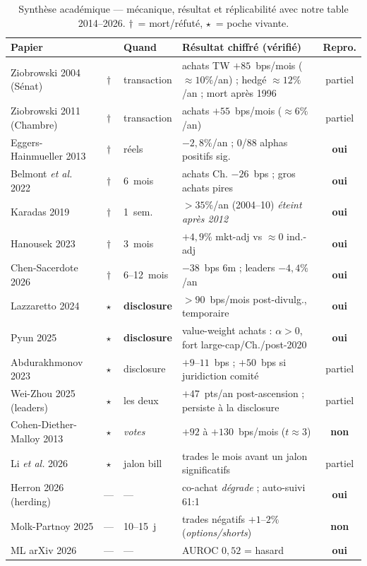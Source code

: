 \documentclass[11pt,a4paper]{article}
\newcommand{\rok}{\textcolor{vert}{\textbf{oui}}}
\newcommand{\rno}{\textcolor{rouge}{\textbf{non}}}
\newcommand{\rpart}{\textcolor{gris}{partiel}}
\newcommand{\mort}{\textcolor{rouge}{$\dagger$}}
\newcommand{\vivant}{\textcolor{vert}{$\star$}}
\begin{document}
\begin{table}[t]\centering\small
\caption{Synthèse académique --- mécanique, résultat et réplicabilité avec notre table 2014--2026.
\mort{}~= mort/réfuté, \vivant{}~= poche vivante.}
\renewcommand{\arraystretch}{1.15}
\begin{tabularx}{\textwidth}{@{}p{2.7cm} c p{1.6cm} X c@{}}
\toprule
\textbf{Papier} & & \textbf{Quand} & \textbf{Résultat chiffré (vérifié)} & \textbf{Repro.} \\
\midrule
Ziobrowski 2004 (Sénat) & \mort & transaction & achats TW $+85$~bps/mois ($\approx\!10\%$/an) ; hedgé $\approx\!12\%$/an ; mort après 1996 & \rpart \\
Ziobrowski 2011 (Chambre) & \mort & transaction & achats $+55$~bps/mois ($\approx\!6\%$/an) & \rpart \\
Eggers-Hainmueller 2013 & \mort & réels & $-2{,}8\%$/an ; 0/88 alphas positifs sig. & \rok \\
Belmont \textit{et al.} 2022 & \mort & 6~mois & achats Ch. $-26$~bps ; gros achats pires & \rok \\
Karadas 2019 & \mort & 1~sem. & $>35\%$/an (2004--10) \emph{éteint après 2012} & \rok \\
Hanousek 2023 & \mort & 3~mois & $+4{,}9\%$ mkt-adj vs $\approx\!0$ ind.-adj & \rok \\
Chen-Sacerdote 2026 & \mort & 6--12~mois & $-38$~bps 6m ; leaders $-4{,}4\%$/an & \rok \\
\midrule
Lazzaretto 2024 & \vivant & \textbf{disclosure} & $>90$~bps/mois post-divulg., temporaire & \rok \\
Pyun 2025 & \vivant & \textbf{disclosure} & value-weight achats : $\alpha>0$, fort large-cap/Ch./post-2020 & \rok \\
Abdurakhmonov 2023 & \vivant & disclosure & $+9$--$11$~bps ; $+50$~bps si juridiction comité & \rpart \\
Wei-Zhou 2025 (leaders) & \vivant & les deux & $+47$~pts/an post-ascension ; persiste à la disclosure & \rpart \\
Cohen-Diether-Malloy 2013 & \vivant & \emph{votes} & $+92$ à $+130$~bps/mois ($t\!\approx\!3$) & \rno \\
Li \textit{et al.} 2026 & \vivant & jalon bill & trades le mois avant un jalon significatifs & \rpart \\
\midrule
Herron 2026 (herding) & --- & --- & co-achat \emph{dégrade} ; auto-suivi 61:1 & \rok \\
Molk-Partnoy 2025 & --- & 10--15~j & trades négatifs $+1$--$2\%$ (\emph{options/shorts}) & \rno \\
ML arXiv 2026 & --- & --- & AUROC $0{,}52$ = hasard & \rok \\
\bottomrule
\end{tabularx}
\end{table}
\end{document}
